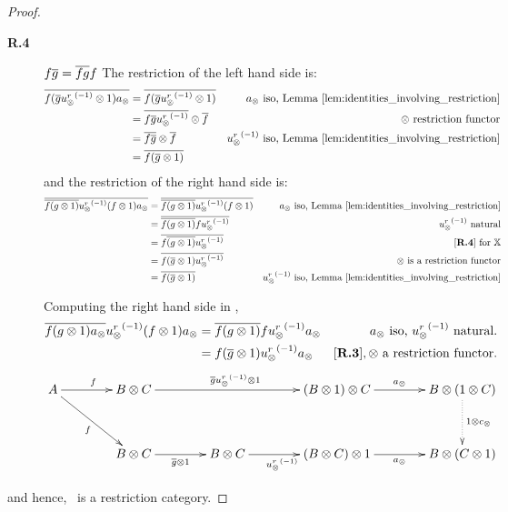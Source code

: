 \begin{proof}
\begin{description}
    \item[\textbf{R.4}] $f \overline{g} = \overline{f g} f$ The restriction of the left hand side is:
      \begin{align*}
        \overline{f (\overline{g} {u_{\otimes}^r}^{(-1)}\otimes 1) a_{\otimes}}
          & = \overline{f (\overline{g} {u_{\otimes}^r}^{(-1)}\otimes 1)} & a_{\otimes}
          \text{ iso, Lemma \ref{lem:identities_involving_restriction}} \\
        & = \overline{f \overline{g} {u_{\otimes}^r}^{(-1)}} \otimes \overline{f} & \otimes \text{ restriction functor}\\
        & = \overline{f \overline{g}} \otimes \overline{f} & {u_{\otimes}^r}^{(-1)}
          \text{ iso, Lemma \ref{lem:identities_involving_restriction}} \\
        & = \overline{f (\overline{g} \otimes 1)}
      \end{align*}
      and the restriction of the right hand side is:
      \begin{align*}
        \rst{\rst{f (g \* 1)} \inv{\usr} (f\* 1) a_{\*}}
          & = \rst{\rst{f (g \* 1)} \inv{\usr} (f\* 1) } & a_{\*}
          \text{ iso, Lemma \ref{lem:identities_involving_restriction}}\\
        & = \rst{\rst{f (g \* 1)} f \inv{\usr}  } & \inv{\usr} \text{ natural}\\
        & = \rst{f \rst{(g \* 1)}  \inv{\usr}  } & \text{ \rfour for }\X\\
        & = \rst{f (\rst{g} \* 1)  \inv{\usr}  } & \* \text{ is a restriction functor}\\
        & = \rst{f (\rst{g} \* 1)    } & \inv{\usr}
          \text{ iso, Lemma \ref{lem:identities_involving_restriction}}
      \end{align*}

      Computing the right hand side in \X,
      \begin{align*}
        \overline{f(g\otimes 1)a_{\otimes}} {u_{\otimes}^r}^{(-1)} (f\otimes 1) a_{\otimes}
          & = \overline{f(g\otimes 1)} f {u_{\otimes}^r}^{(-1)} a_{\otimes} & a_{\otimes} \text{ iso, } {\ensuremath{u_{\otimes}^r}}^{(-1)}\text{ natural.}\\
        & = f (\overline{g} \otimes 1) {u_{\otimes}^r}^{(-1)} a_{\otimes} & [\text{\bfseries {R}.{3}}], \otimes \text{ a restriction functor.}
      \end{align*}
      \[
        \xymatrix @C=40pt @R=35pt{
          A \ar[r]^f \ar[dr]_{f}
            & B\* C \ar[rr]^{\restr{g} \inv{\usr}\* 1}
            &
            & (B\* 1) \* C \ar[r]^{a_{\*}}
            & B \* (1 \* C)\ar@{.>}[d]^{1\*c_{\*}}\\
          & B\*C \ar[r]_{\rst{g}\*1}
            & B \* C \ar[r]_{\inv{\usr}}
            & (B \* C) \* 1 \ar[r]_{a_{\*}}
            & B \* (C\*1)
        }
      \]
  \end{description}

  and hence, \Xt\ is a restriction category.
\end{proof}
